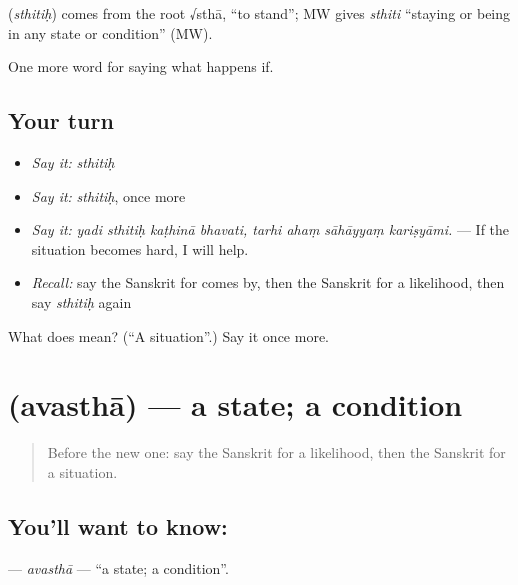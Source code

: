 \begin{cousinweb}
\textbf{} (\emph{sthitiḥ}) comes from the root √sthā, \textquotedblleft{}to stand\textquotedblright{}; MW gives \emph{sthiti} \textquotedblleft{}staying or being in any state or condition\textquotedblright{} (MW).
\end{cousinweb}

\begin{grammarlens}[title={What you've built}]
One more word for saying what happens if.
\end{grammarlens}

\subsection*{Your turn}
\begin{itemize}
\raggedright
  \item \emph{Say it:} \emph{sthitiḥ}
  \item \emph{Say it:} \emph{sthitiḥ}, once more
  \item \emph{Say it:} \emph{yadi sthitiḥ kaṭhinā bhavati, tarhi ahaṃ sāhāyyaṃ kariṣyāmi.} — If the situation becomes hard, I will help.
  \item \emph{Recall:} say the Sanskrit for comes by, then the Sanskrit for a likelihood, then say \emph{sthitiḥ} again
\end{itemize}

\begin{tcolorbox}[breakable,colback=teal!4,colframe=teal!35!black,title={Before you move on}]
What does  mean? (\textquotedblleft{}A situation\textquotedblright{}.) Say it once more.
\end{tcolorbox}
\section[\texorpdfstring{\sk{अवस्था} (avasthā)}{अवस्था (avasthā)}]{ (avasthā) — a state; a condition}

\label{lesson:SA-C370-avastha}



\begin{quote}
Before the new one: say the Sanskrit for a likelihood, then the Sanskrit for a situation.
\end{quote}

\subsection*{You'll want to know: }
\textbf{} — \emph{avasthā} — \textquotedblleft{}a state; a condition\textquotedblright{}.

